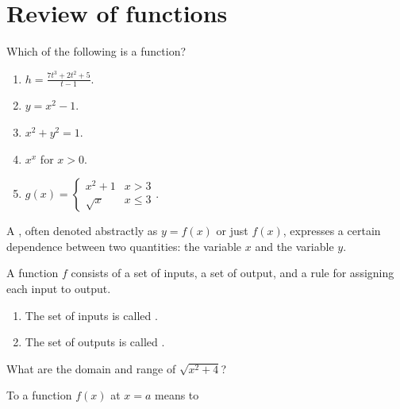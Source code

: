 \documentclass[../main.tex]{subfiles}
\begin{document}
 \section{Review of functions}
  \begin{example}
    Which of the following is  a function?
    \begin{enumerate}[label=(\alph*)]
      \item \(h = \frac{7t^{3} + 2t^{2} + 5}{t - 1}\).
      \item \(y = x^{2} - 1\).
      \item \(x^{2} + y^{2} = 1\).
      \item \(x^{x}\) for \(x > 0\).
      \item \(g(x) = \begin{cases} x^{2} + 1 & x > 3\\ \sqrt{x} & x \le 3 \end{cases}\).
    \end{enumerate}
  \end{example} 


  A , often denoted abstractly as \(y = f(x)\) or just \(f(x)\), expresses a certain dependence between two quantities: the  variable \(x\) and the  variable \(y\).
  \vspace{1em}

  \begin{mdframed}[style=withref]
    A function \(f\) consists of a set of inputs, a set of output, and a rule for assigning each input to \underline{\hspace{2in}} output.
    \begin{enumerate}
      \item The set of inputs is called \underline{\hspace{1in}}.
      \item The set of outputs is called \underline{\hspace{1in}}.
    \end{enumerate}

  \end{mdframed}

  \begin{example}
    What are the domain and range of \(\sqrt{x^{2} + 4}\)?
  \end{example}

  To  a function \(f(x)\) at \(x = a\) means to \underline{\hspace{3in}}
\end{document}
